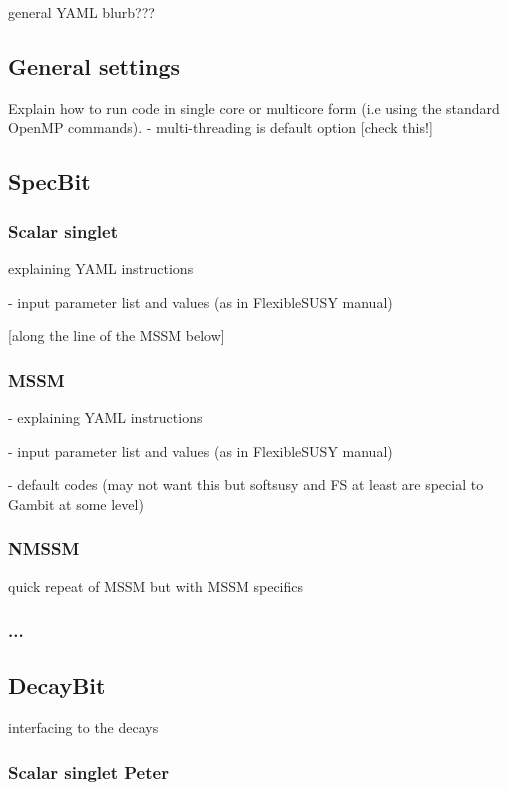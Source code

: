 \documentclass[11pt,a4paper]{article}
\newcommand{\Peter}[1]{{\bf\color{green}Peter #1}}
\begin{document}
general YAML blurb???

\subsection{General settings}

Explain how to run code in single core or multicore form (i.e using the standard OpenMP commands).
- multi-threading is default option [check this!]

\subsection{SpecBit}

\subsubsection{Scalar singlet}

explaining YAML instructions 

- input parameter list and values (as in FlexibleSUSY manual)

[along the line of the MSSM below]

\subsubsection{MSSM}

- explaining YAML instructions 

- input parameter list and values (as in FlexibleSUSY manual)

- default codes 
(may not want this but softsusy and FS at least 
are special to Gambit at some level) 

\subsubsection{NMSSM}

    quick repeat of MSSM but with MSSM specifics

\subsubsection{...}

\subsection{DecayBit}

interfacing to the decays

\subsubsection{Scalar singlet \Peter{}}
\end{document}
